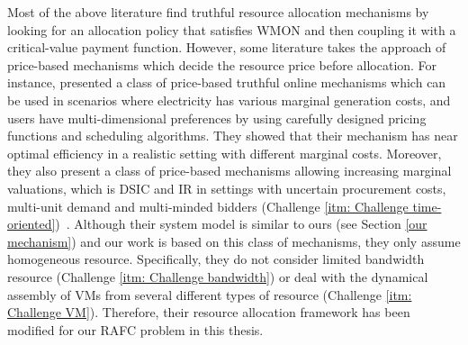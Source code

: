 \documentclass[11pt]{phdthesis}
\begin{document}
Most of the above literature find truthful resource allocation mechanisms by looking for an allocation policy that satisfies WMON and then coupling it with a critical-value payment function. However, some literature takes the approach of price-based mechanisms which decide the resource price before allocation. For instance, \citet{hayakawa2015online} presented a class of price-based truthful online mechanisms which can be used in scenarios where electricity has various marginal generation costs, and users have multi-dimensional preferences by using carefully designed pricing functions and scheduling algorithms. They showed that their mechanism has near optimal efficiency in a realistic setting with different marginal costs. Moreover, they also present a class of price-based mechanisms allowing increasing marginal valuations, which is DSIC and IR in settings with uncertain procurement costs, multi-unit demand and multi-minded bidders (Challenge \ref{itm: Challenge time-oriented})~\citep{hayakawa2018price}. 
Although their system model is similar to ours (see Section \ref{our mechanism}) and our work is based on this class of mechanisms, they only assume homogeneous resource. Specifically, they do not consider limited bandwidth resource (Challenge \ref{itm: Challenge bandwidth}) or deal with the dynamical assembly of VMs from several different types of resource (Challenge \ref{itm: Challenge VM}). Therefore, their resource allocation framework has been modified for our RAFC problem in this thesis.
\end{document}
